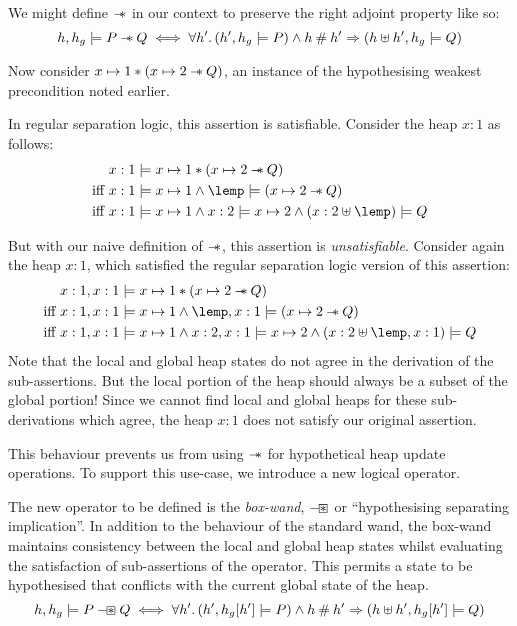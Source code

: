 \documentclass[a4paper,notitlepage]{report}
\begin{document}
We might define $\mathbin{-\mkern-6mu *}$ in our context to preserve the right adjoint property like so:
\[
  h,h_g \models P \mathbin{-\mkern-6mu *} Q \iff \forall h' \mathpunct{.} (h',h_g \models P) \land h \mathbin{\#}
    h' \Rightarrow (h \uplus h',h_g \models Q)
\]

Now consider $x \mapsto 1 \mathbin{*} (x \mapsto 2 \mathbin{-\mkern-6mu *} Q)$, an instance of the
hypothesising weakest precondition noted earlier.

 In regular separation logic, this assertion is satisfiable. Consider the heap
 $x:1$ as follows:
\begin{align*}
           & x:1 \satisfies x \pointsto 1 \sep (x \pointsto 2 \wand Q) \\
\text{iff } & x:1 \satisfies x \pointsto 1 \land \lemp \satisfies (x \pointsto 2 \wand Q) \\
\text{iff } & x:1 \satisfies x \pointsto 1 \land x:2 \satisfies x \pointsto 2 \land (x:2 \disju \lemp) \satisfies Q
\end{align*}

But with our naive definition of $\mathbin{-\mkern-6mu *}$, this assertion is
\emph{unsatisfiable}. Consider again the heap $x:1$, which satisfied the regular
separation logic version of this assertion:
\begin{align*}
           & x:1,x:1 \satisfies x \pointsto 1 \sep (x \pointsto 2 \wand Q) \\
\text{iff } & x:1,x:1 \satisfies x \pointsto 1 \land \lemp,x:1 \satisfies (x \pointsto 2 \wand Q) \\
\text{iff } & x:1,x:1 \satisfies x \pointsto 1 \land x:2,x:1 \satisfies x \pointsto 2 \land (x:2 \disju \lemp,x:1) \satisfies Q
\end{align*}
Note that the local and global heap states do not agree in the derivation of the
sub-assertions. But the local portion of the heap should always be a subset of the
global portion! Since we cannot find local and global heaps for these
sub-derivations which agree, the heap $x:1$ does not satisfy our original assertion.

This behaviour prevents us from using $\mathbin{-\mkern-6mu *}$ for hypothetical heap update
operations. To support this use-case, we introduce a new logical operator.

The new operator to be defined is the \emph{box-wand}, $\mathbin{-\mkern-3mu \boxast}$ or
``hypothesising separating implication''. In addition
to the behaviour of the standard wand, the box-wand maintains consistency
between the local and global heap states whilst evaluating the satisfaction of
sub-assertions of the operator. This permits a state to be hypothesised that
conflicts with the current global state of the heap.
\[
  h,h_g \models P \mathbin{-\mkern-3mu \boxast} Q \iff \forall h' \mathpunct{.} (h',h_g[h'] \models P)
  \land h \mathbin{\#} h' \Rightarrow (h \uplus h', h_g[h'] \models Q)
\]
\end{document}
